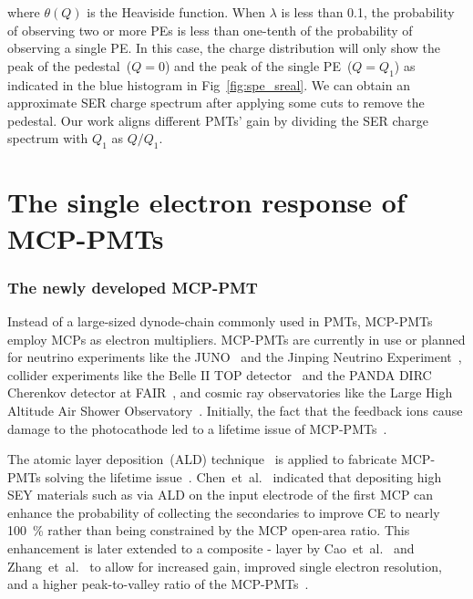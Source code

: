where $\theta(Q)$ is the Heaviside function.
When $\lambda$ is less than 0.1,
the probability of observing two or more PEs is less than one-tenth of the probability of observing a single PE.
In this case, the charge distribution will only show the peak of the pedestal~($Q=0$) and the peak of the single PE~($Q=Q_1$) as indicated in the blue histogram in Fig~\ref{fig:spe_sreal}.
We can obtain an approximate SER charge spectrum after applying some cuts to remove the pedestal.
Our work aligns different PMTs' gain by dividing the SER charge spectrum with $Q_1$ as $Q/Q_1$.

\section{The single electron response of MCP-PMTs}
\subsubsection{The newly developed MCP-PMT}
Instead of a large-sized dynode-chain commonly used in PMTs,
MCP-PMTs employ MCPs as electron multipliers.
MCP-PMTs are currently in use or planned for neutrino experiments
like the JUNO~\cite{ZHU2020162002} and the Jinping Neutrino Experiment~\cite{Zhang:2023ued},
collider experiments like the Belle II TOP detector~\cite{MATSUOKA2014148} and the PANDA DIRC Cherenkov detector at FAIR~\cite{KRAUSS2023168659}, and cosmic ray observatories like the Large High Altitude Air Shower Observatory~\cite{Cao2019UpgradingPT}.
Initially, the fact that the feedback ions cause damage to the photocathode led to a lifetime issue of MCP-PMTs~\cite{N2006Lifetime}.

The atomic layer deposition~(ALD) technique~\cite{2012An}
is applied to fabricate MCP-PMTs solving the lifetime issue~\cite{Lehmann:2022ret}.
Chen~et~al.~\cite{2016Optimization} indicated that depositing high SEY materials
such as  via ALD on the input electrode of the first MCP
can enhance the probability of collecting the secondaries to improve CE
to nearly \SI{100}{\%} rather than being constrained by the MCP open-area ratio.
This enhancement is later extended to a composite - layer
by Cao~et~al.~\cite{cao_secondary_2021} and Zhang~et~al.~\cite{zzj2021Al}
to allow for increased gain, improved single electron resolution,
and a higher peak-to-valley ratio of the MCP-PMTs~\cite{2021Effects}.

